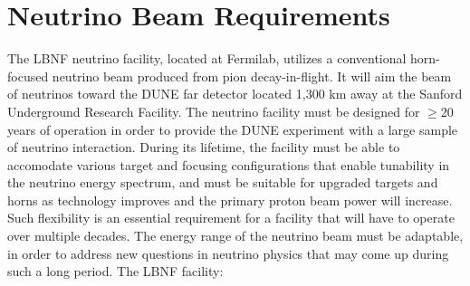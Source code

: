 \section{Neutrino Beam Requirements}
\label{sec:physics-lbnosc-beam-req}
The LBNF neutrino facility, located at Fermilab, utilizes a conventional horn-focused neutrino beam produced 
from pion decay-in-flight. It will aim the beam of neutrinos toward
the DUNE far detector located 1,300 km away at the Sanford Underground
Research Facility. The neutrino facility must be designed for $\ge 20$
years of operation in order to provide the DUNE experiment with a
large sample of neutrino interaction. During its lifetime, the
facility must be able to accomodate various target and focusing
configurations that enable tunability in the neutrino energy spectrum,
and must be suitable for upgraded targets and horns as technology
improves and the primary proton beam power will increase. Such
flexibility is an essential requirement for a facility that will have
to operate over multiple decades. The energy range of the neutrino
beam must be adaptable, in order to address new questions in neutrino physics that may come up during such a long period.
The LBNF facility:
